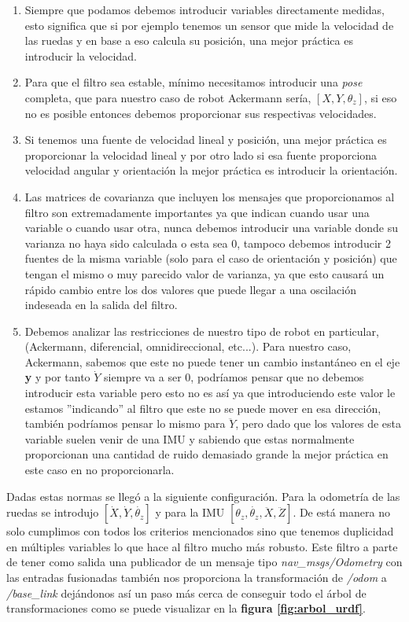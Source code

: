 \begin{enumerate}
    \item Siempre que podamos debemos introducir variables directamente medidas, esto significa que si por ejemplo tenemos un sensor que 
mide la velocidad de las ruedas y en base a eso calcula su posición, una mejor práctica es introducir la velocidad.
    \item Para que el filtro sea estable, mínimo necesitamos introducir una \textit{pose} completa, que para nuestro caso de robot Ackermann 
sería, $[ X,Y,\theta_{z}]$, si eso no es posible entonces debemos proporcionar sus respectivas velocidades.
    \item Si tenemos una fuente de velocidad lineal y posición, una mejor práctica es proporcionar la velocidad lineal y por otro lado si 
esa fuente proporciona velocidad angular y orientación la mejor práctica es introducir la orientación.
    \item Las matrices de covarianza que incluyen los mensajes que proporcionamos al filtro son extremadamente importantes ya que indican 
cuando usar una variable o cuando usar otra, nunca debemos introducir una variable donde su varianza no haya sido calculada o esta sea 0, 
tampoco debemos introducir 2 fuentes de la misma variable (solo para el caso de orientación y posición) que tengan el mismo o muy parecido 
valor de varianza, ya que esto causará un rápido cambio entre los dos valores que puede llegar a una oscilación indeseada en la salida del 
filtro.
    \item Debemos analizar las restricciones de nuestro tipo de robot en particular, (Ackermann, diferencial, omnidireccional, etc...). 
Para nuestro caso, Ackermann, sabemos que este no puede tener un cambio instantáneo en el eje \textbf{y} y por tanto $\dot{Y}$ siempre va 
a ser 0, podríamos pensar que no debemos introducir esta variable pero esto no es así ya que introduciendo este valor le estamos 
''indicando'' al filtro que este no se puede mover en esa dirección, también podríamos pensar lo mismo para $\ddot{Y}$, pero dado que los 
valores de esta variable suelen venir de una IMU y sabiendo que estas normalmente proporcionan una cantidad de ruido demasiado grande la 
mejor práctica en este caso en no proporcionarla.
\end{enumerate}

Dadas estas normas se llegó a la siguiente configuración. Para la odometría de las ruedas se introdujo 
$[ \dot{X},\dot{Y},\dot{\theta_{z}} ]$ y para la IMU $[ \theta_{z},\dot{\theta_{z}},\ddot{X},\ddot{Z} ]$. De está manera no solo cumplimos 
con todos los criterios mencionados sino que tenemos duplicidad en múltiples variables lo que hace al filtro mucho más robusto. Este filtro 
a parte de tener como salida una publicador de un mensaje tipo \textit{nav\_msgs/Odometry} con las entradas fusionadas también nos 
proporciona la transformación de \textit{/odom} a \textit{/base\_link} dejándonos así un paso más cerca de conseguir todo el árbol de 
transformaciones como se puede visualizar en la \textbf{figura \ref{fig:arbol_urdf}}.


